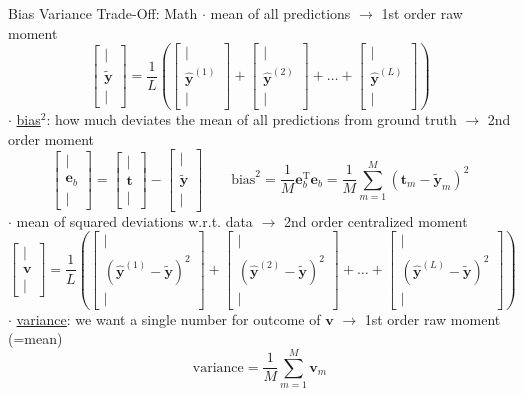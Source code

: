 \documentclass[mathserif, aspectratio=1610]{intbeamer}
\begin{document}
\begin{frame}[t]{Bias Variance Trade-Off: Math}
%
\vspace{-1em}
%
$\cdot$ mean of all predictions $\rightarrow$ 1st order raw moment
$$
\begin{bmatrix}
|\\\tilde{\bm{y}}\\|
\end{bmatrix}
=
\frac{1}{L}
\left(
\begin{bmatrix}
|\\\hat{\bm{y}}^{(1)}\\|
\end{bmatrix}
+\begin{bmatrix}
|\\\hat{\bm{y}}^{(2)}\\|
\end{bmatrix}
+
\dots
+
\begin{bmatrix}
|\\\hat{\bm{y}}^{(L)}\\|
\end{bmatrix}
\right)
$$
%
$\cdot$ \underline{bias$^2$}: how much deviates the mean of all predictions from ground truth $\rightarrow$ 2nd order moment
$$
\begin{bmatrix}
|\\\bm{e}_b\\|
\end{bmatrix}=
\begin{bmatrix}
|\\\bm{t}\\|
\end{bmatrix}-
\begin{bmatrix}
|\\\tilde{\bm{y}}\\|
\end{bmatrix}
\qquad
\text{bias}^2 = \frac{1}{M}\bm{e}_b^\mathrm{T} \bm{e}_b = \frac{1}{M} \sum\limits_{m=1}^{M} (\bm{t}_m - \tilde{\bm{y}}_m)^2
$$
%
$\cdot$ mean of squared deviations w.r.t. data $\rightarrow$ 2nd order centralized moment
$$
\begin{bmatrix}
|\\\bm{v}\\|
\end{bmatrix}
=
\frac{1}{L}
\left(
\begin{bmatrix}
|\\(\hat{\bm{y}}^{(1)}-\tilde{\bm{y}})^2\\|
\end{bmatrix}
+\begin{bmatrix}
|\\(\hat{\bm{y}}^{(2)}-\tilde{\bm{y}})^2\\|
\end{bmatrix}
+
\dots
+
\begin{bmatrix}
|\\(\hat{\bm{y}}^{(L)}-\tilde{\bm{y}})^2\\|
\end{bmatrix}
\right)
$$
%
$\cdot$ \underline{variance}: we want a single number for outcome of $\bm{v}$ $\rightarrow$ 1st order raw moment (=mean)
$$
\text{variance} = \frac{1}{M} \sum\limits_{m=1}^{M} \bm{v}_m
$$

\end{frame}
\end{document}
